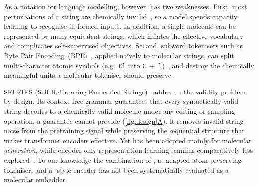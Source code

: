 \documentclass[11pt,a4paper]{article}
\begin{document}
\begin{table}[htbp]
  \caption{%
    Overview of representative molecular string encoder models.
    \emph{Repr.} (Representation): molecular string representation used for pretraining.
    \emph{Tokeniser}: tokenisation strategy
    (BPE = Byte Pair Encoding; atom = atom-level; APE = Atom Pair Encoding).
    \emph{Arch.} (Architecture): encoder backbone.
    \emph{Params} (Parameters): trainable parameters in millions.
    \emph{Size} (of dataset): pretraining corpus size in millions of molecules.
    Embedding dimensions for these and additional models are listed in
    \cref{tab:embedders-full} (\cref{app:embedders}).
    \textbf{Bold} rows indicate the models introduced here.
    $^{\dagger}$The ChemBERTa family spans several released checkpoints of
    approximately 5--46M parameters; the 77M label denotes pretraining
    molecules, not parameters.
  }%
  \label{tab:embedder-comparison}
\end{table}

As a notation for language modelling, however, \smiles{} has two weaknesses.
First, most perturbations of a \smiles{} string are chemically
invalid~\citep{krennSELFIESSelfReferencingEmbedded2020}, so a model spends
capacity learning to recognise ill-formed inputs. In addition, a single molecule can be represented by
many equivalent strings, which inflates the effective vocabulary and
complicates self-supervised objectives.
Second, subword tokenisers such as Byte Pair Encoding~(BPE)~\citep{sennrichNeuralMachineTranslation2016},
applied na\"{i}vely to molecular strings, can split multi-character atomic symbols
(e.g.\ \texttt{Cl} into \texttt{C}~+~\texttt{l})~\citep{leonComparingSMILESSELFIES2024},
and destroy the chemically meaningful units a molecular tokeniser should
preserve.

SELFIES (Self-Referencing Embedded Strings)~\citep{krennSELFIESSelfReferencingEmbedded2020}
addresses the validity problem by design. Its context-free grammar
guarantees that every syntactically valid \selfies{} string decodes to a
chemically valid molecule under any editing or sampling operation, a guarantee
\smiles{} cannot provide (\hyperref[fig:design]{\cref*{fig:design}A}).
It removes invalid-string noise from the pretraining signal while
preserving the sequential structure that makes transformer encoders effective.
Yet \selfies{} has been adopted mainly for molecular \emph{generation}, while
encoder-only \selfies{} representation learning remains comparatively
less explored~\citep{leonComparingSMILESSELFIES2024}. To our knowledge the
combination of \selfies{}, a \selfies{}-adapted atom-preserving tokeniser, and
a \modernbert{}-style encoder has not been systematically evaluated as a
molecular embedder.
\end{document}
